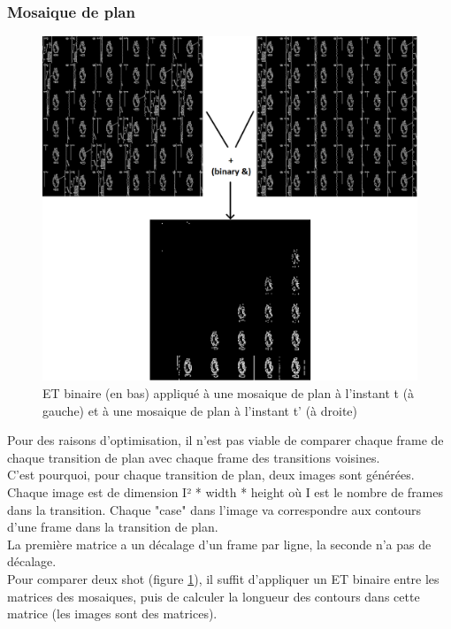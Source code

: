 \documentclass[11pt]{article}
\begin{document}
\subsubsection{Mosaique de plan}
\label{sec:orgeeb98d0}
\begin{figure}[htbp]
\centering
\includegraphics[width=16cm]{mosaique_add.png}
\caption{ET binaire (en bas) appliqué à une mosaique de plan à l'instant t (à gauche) et à une mosaique de plan à l'instant t' (à droite) \label{mosaic}}
\end{figure}
Pour des raisons d'optimisation, il n'est pas viable de comparer chaque frame de chaque transition de plan avec chaque frame des transitions voisines.\\

C'est pourquoi, pour chaque transition de plan, deux images sont générées.\\

Chaque image est de dimension I² * width * height où I est le nombre de frames dans la transition. Chaque "case" dans l'image va correspondre aux contours d'une frame dans la transition de plan.\\

La première matrice a un décalage d'un frame par ligne, la seconde n'a pas de décalage.\\

Pour comparer deux shot (figure \ref{mosaic}), il suffit d’appliquer un ET binaire entre les matrices des mosaiques, puis de calculer la longueur des contours dans cette matrice (les images sont des matrices).\\
\end{document}
